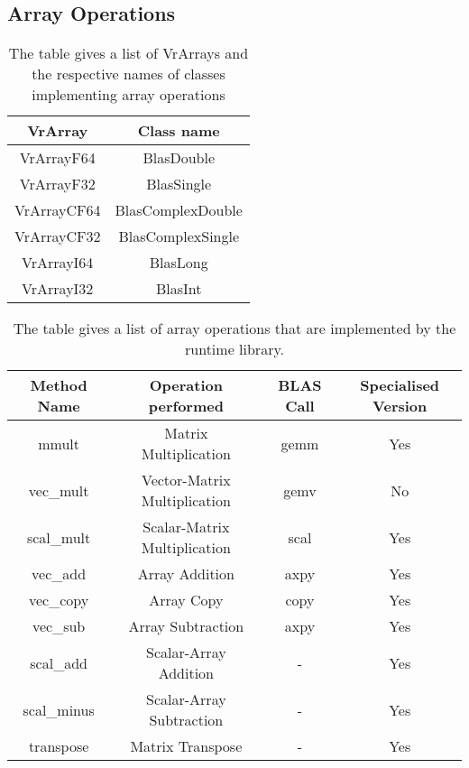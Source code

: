 \subsection{Array Operations}
\label{subsec:arrayOps}
\begin{table}[h]
\centering
\begin{tabular}{|c|c|}
\hline
VrArray     & Class name        \\ \hline
VrArrayF64  & BlasDouble        \\ \hline
VrArrayF32  & BlasSingle        \\ \hline
VrArrayCF64 & BlasComplexDouble \\ \hline
VrArrayCF32 & BlasComplexSingle \\ \hline
VrArrayI64  & BlasLong          \\ \hline
VrArrayI32  & BlasInt           \\ \hline
\end{tabular}
\caption{The table gives a list of VrArrays and the respective names of classes implementing array operations}
\label{tab:vrArrayToBlasClass}
\end{table}
\begin{table}[h]
\centering
\begin{tabular}{|c|c|c|c|}
\hline
Method Name & Operation performed          & BLAS Call & Specialised Version \\ \hline
mmult       & Matrix Multiplication        & gemm      & Yes                 \\ \hline
vec\_mult   & Vector-Matrix Multiplication & gemv      & No                  \\ \hline
scal\_mult  & Scalar-Matrix Multiplication & scal      & Yes                 \\ \hline
vec\_add    & Array Addition               & axpy      & Yes                 \\ \hline
vec\_copy   & Array Copy                   & copy      & Yes                 \\ \hline
vec\_sub    & Array Subtraction            & axpy      & Yes                 \\ \hline
scal\_add   & Scalar-Array Addition        & -         & Yes                 \\ \hline
scal\_minus & Scalar-Array Subtraction     & -         & Yes                 \\ \hline
transpose   & Matrix Transpose             & -         & Yes                 \\ \hline
\end{tabular}
\caption{The table gives a list of array operations that are implemented by the runtime library.}
\label{tab:blasMethods}
\end{table}
